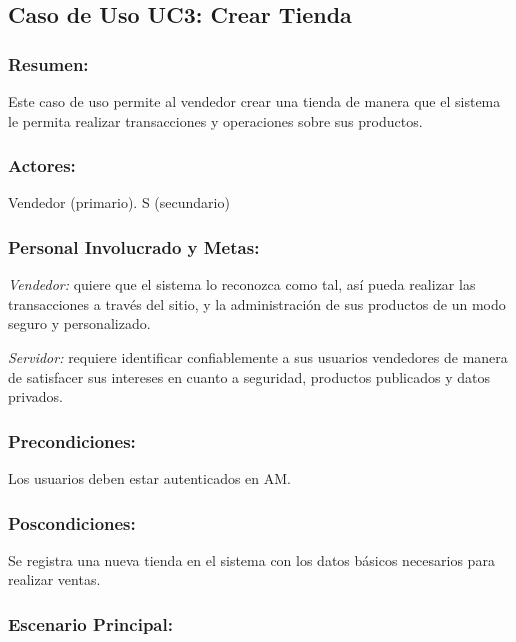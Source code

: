 
\subsection{Caso de Uso UC3: Crear Tienda}

\begin{framed}


\subsubsection{Resumen:} Este caso de uso permite al vendedor crear una tienda de manera que el sistema le permita realizar transacciones y operaciones sobre sus productos.


\subsubsection{Actores:} Vendedor (primario). S (secundario)

\subsubsection{Personal Involucrado y Metas:}

\emph{Vendedor:} quiere que el sistema lo reconozca como tal, así pueda realizar las transacciones a través del sitio, y la administración de sus productos de un modo seguro y personalizado.

\emph{Servidor:} requiere identificar confiablemente a sus usuarios vendedores de manera de satisfacer sus intereses en cuanto a seguridad, productos publicados y datos privados. 

\subsubsection{Precondiciones:} 
Los usuarios deben estar autenticados en AM. 

\subsubsection{Poscondiciones:} 
Se registra una nueva tienda en el sistema con los datos básicos necesarios para realizar ventas.

\subsubsection{Escenario Principal: }


\end{framed}
